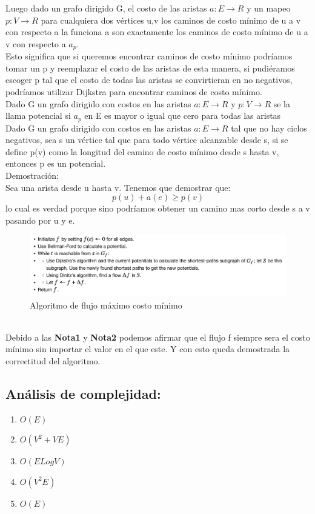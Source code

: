 \documentclass[sn-mathphys,Numbered]{sn-jnl}%
\theoremstyle{thmstyleone}%
\theoremstyle{thmstyletwo}%
\theoremstyle{thmstylethree}%
\begin{document}
Luego dado un grafo dirigido G, el costo de las aristas $a: E\rightarrow R$ y un mapeo $p: V\rightarrow R$ para cualquiera dos vértices u,v los caminos de costo mínimo de u a v con respecto a la funciona a son exactamente los caminos de costo mínimo de u a v con respecto a $a_p$.\\
Esto significa que si queremos encontrar caminos de costo mínimo podríamos tomar un p y reemplazar el costo de las aristas de esta manera, si pudiéramos escoger p tal que el costo de todas las aristas se convirtieran en no negativos, podríamos utilizar Dijkstra para encontrar caminos de costo mínimo.\\
Dado G un grafo dirigido con costos en las aristas $a: E \rightarrow R$ y $p: V \rightarrow R$ se la llama potencial si $a_p$ en E es mayor o igual que cero para todas las aristas\\

Dado G un grafo dirigido con costos en las aristas $a: E \rightarrow R$ tal que no hay ciclos negativos, sea s un vértice tal que para todo vértice alcanzable desde s, si se define p(v) como la longitud del camino de costo mínimo desde s hasta v, entonces p es un potencial.\\
Demostración:\\
Sea una arista desde u hasta v. Tenemos que demostrar que:
$$p(u) + a(e) \geq p(v)$$
lo cual es verdad porque sino podríamos obtener un camino mas corto desde s a v pasando por u y e.

    \begin{figure}[htb]
        \centering
        \includegraphics[width=1.3\textwidth]{algorithm_2.png}
        \centering
        \caption{Algoritmo de flujo máximo costo mínimo }
    \end{figure}
\\

Debido a las \textbf{Nota1} y \textbf{Nota2}  podemos afirmar que el flujo f siempre sera el costo mínimo sin importar el valor en el que este. Y con esto queda demostrada la correctitud del algoritmo.\\

\subsection*{Análisis de complejidad:}
\begin{enumerate}
    \item $O(E)$
    \item $O(V^2 + VE)$
    \item $O(ELogV)$
    \item $O(V^2E)$
    \item $O(E)$
\end{enumerate}
\end{document}
